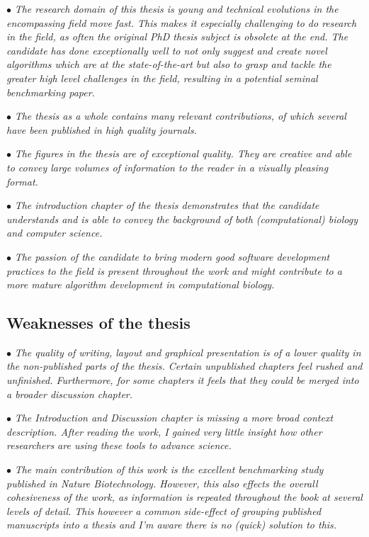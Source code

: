 \documentclass[10pt]{article}
\newcommand{\exam}[2][\  ]{\hspace{0pt}\marginpar{\color{red}#1}$\bullet$ \textit{#2}}
\newcommand{\imp}[1]{{\color{red} #1}}
\newcommand{\nimp}[1]{{\color{gray} #1}}
\newcommand{\bigexclaim}{\raisebox{-0.1em}{\BigTriangleUp}\hspace{-0.32em}\llap{\small\textbf{!}}\hspace{0.32em}}
\newcommand{\tagimp}{\bigexclaim}
\newcommand{\tagtime}{{\Large $\hourglass$}}
\begin{document}
{{\exam{\nimp{The research domain of this thesis is young and technical evolutions in the
	encompassing field move fast. This makes it especially challenging to do
	research in the field, as often the original PhD thesis subject is obsolete at the
	end. The candidate has done exceptionally well to not only suggest and create
	novel algorithms which are at the state-of-the-art but also to grasp and tackle
	the greater high level challenges in the field, resulting in a potential seminal
	benchmarking paper.}}

\exam{\nimp{The thesis as a whole contains many relevant contributions, of which several
	have been published in high quality journals.}}

\exam{\nimp{The figures in the thesis are of exceptional quality. They are creative and able
	to convey large volumes of information to the reader in a visually pleasing
	format.}}

\exam{\nimp{The introduction chapter of the thesis demonstrates that the candidate
	understands and is able to convey the background of both (computational)
	biology and computer science.}}

\exam{\nimp{The passion of the candidate to bring modern good software development
	practices to the field is present throughout the work and might contribute to a
	more mature algorithm development in computational biology.}}



\subsection{Weaknesses of the thesis}
\exam[\tagimp \tagtime]{\imp{The quality of writing, layout and graphical presentation is of a lower quality in the non-published parts of the thesis. Certain unpublished chapters feel rushed and unfinished. Furthermore, for some chapters it feels that they could be merged into a broader discussion chapter.}}

\exam[\tagimp \tagtime]{\imp{The Introduction and Discussion chapter is missing a more broad context
	description. After reading the work, I gained very little insight how other
	researchers are using these tools to advance science.}}


\exam{\nimp{The main contribution of this work is the excellent benchmarking study
	published in Nature Biotechnology.} However, this also effects the overall
	cohesiveness of the work, as information is repeated throughout the book at
	several levels of detail. \nimp{This however a common side-effect of grouping
	published manuscripts into a thesis and I’m aware there is no (quick) solution
	to this.}}

}}
\end{document}
